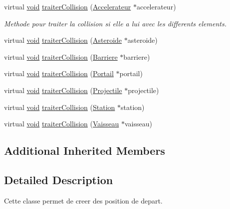 \begin{DoxyCompactItemize}
\item 
virtual \hyperlink{wglew_8h_aeea6e3dfae3acf232096f57d2d57f084}{void} \hyperlink{class_position_depart_a95ca347cf3fb6aaed0c10631946e3f12}{traiter\-Collision} (\hyperlink{class_accelerateur}{Accelerateur} $\ast$accelerateur)
\begin{DoxyCompactList}\small\item\em Methode pour traiter la collision si elle a lui avec les differents elements. \end{DoxyCompactList}\item 
virtual \hyperlink{wglew_8h_aeea6e3dfae3acf232096f57d2d57f084}{void} \hyperlink{class_position_depart_af159bc9bf4624373bf5bb3f631c3b117}{traiter\-Collision} (\hyperlink{class_asteroide}{Asteroide} $\ast$asteroide)
\item 
virtual \hyperlink{wglew_8h_aeea6e3dfae3acf232096f57d2d57f084}{void} \hyperlink{class_position_depart_afb274942936691d5ed53b52c5719538a}{traiter\-Collision} (\hyperlink{class_barriere}{Barriere} $\ast$barriere)
\item 
virtual \hyperlink{wglew_8h_aeea6e3dfae3acf232096f57d2d57f084}{void} \hyperlink{class_position_depart_adab24313dffd3f9d01d6667002d0a140}{traiter\-Collision} (\hyperlink{class_portail}{Portail} $\ast$portail)
\item 
virtual \hyperlink{wglew_8h_aeea6e3dfae3acf232096f57d2d57f084}{void} \hyperlink{class_position_depart_a01b7a34c56e40f65731ee41a8b18784c}{traiter\-Collision} (\hyperlink{class_projectile}{Projectile} $\ast$projectile)
\item 
virtual \hyperlink{wglew_8h_aeea6e3dfae3acf232096f57d2d57f084}{void} \hyperlink{class_position_depart_ac2c7bce72958d868647ec76cb63db718}{traiter\-Collision} (\hyperlink{class_station}{Station} $\ast$station)
\item 
virtual \hyperlink{wglew_8h_aeea6e3dfae3acf232096f57d2d57f084}{void} \hyperlink{class_position_depart_a749a7a6527729c5115f66384a2ac605a}{traiter\-Collision} (\hyperlink{class_vaisseau}{Vaisseau} $\ast$vaisseau)
\end{DoxyCompactItemize}
\subsection*{Additional Inherited Members}


\subsection{Detailed Description}
Cette classe permet de creer des position de depart. 


